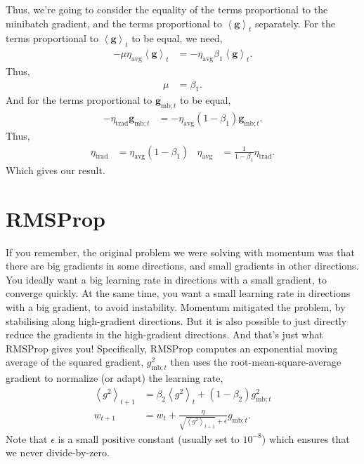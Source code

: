 \documentclass{article}
\newcommand{\bracket}[3]{\left#1 #3 \right#2}
\newcommand{\ab}{\bracket{\langle}{\rangle}}
\newcommand{\0}{\mathbf{0}}
\newcommand{\g}{\mathbf{g}}
\newcommand{\gmbt}{\g_{\text{mb}; t}}
\newcommand{\gsmbt}{g_{\text{mb}; t}}
\newcommand{\vh}{\hat{v}}
\newcommand{\gb}{\mathbf{\ab{g}}}
\newcommand{\gssqb}{\ab{g^2}}
\newcommand{\lrtrad}{\eta_\text{trad}}
\newcommand{\lravg}{\eta_\text{avg}}
\begin{document}
Thus, we're going to consider the equality of the terms proportional to the minibatch gradient, and the terms proportional to $\gb_t$ separately.
For the terms proportional to $\gb_t$ to be equal, we need,
\begin{align}
  - \mu \lravg \gb_{t} &= - \lravg \beta_1 \gb_t.
\end{align}
Thus,
\begin{align}
  \mu &= \beta_1.
\end{align}
And for the terms proportional to $\gmbt$ to be equal,
\begin{align}
  - \lrtrad \gmbt &= - \lravg (1-\beta_1) \gmbt.
\end{align}
Thus,
\begin{align}
  \lrtrad &= \lravg (1-\beta_1) & 
  \lravg &= \tfrac{1}{1 -\beta_1} \lrtrad.
\end{align}
Which gives our result.

\section{RMSProp}

If you remember, the original problem we were solving with momentum was that there are big gradients in some directions, and small gradients in other directions.
You ideally want a big learning rate in directions with a small gradient, to converge quickly.
At the same time, you want a small learning rate in directions with a big gradient, to avoid instability.
Momentum mitigated the problem, by stabilising along high-gradient directions.
But it is also possible to just directly reduce the gradients in the high-gradient directions.
And that's just what RMSProp gives you!
Specifically, RMSProp computes an exponential moving average of the squared gradient, $\gsmbt^2$ then uses the root-mean-square-average gradient to normalize (or adapt) the learning rate,
\begin{align}
  \gssqb_{t+1} &= \beta_2 \gssqb_{t} + (1-\beta_2) \gsmbt^2\\
  \label{eq:rmsprop:w}
  w_{t+1} &= w_t + \frac{\eta}{\sqrt{\gssqb_{t+1}} + \epsilon}\gsmbt.
\end{align}
Note that $\epsilon$ is a small positive constant (usually set to $10^{-8}$) which ensures that we never divide-by-zero.
\end{document}
